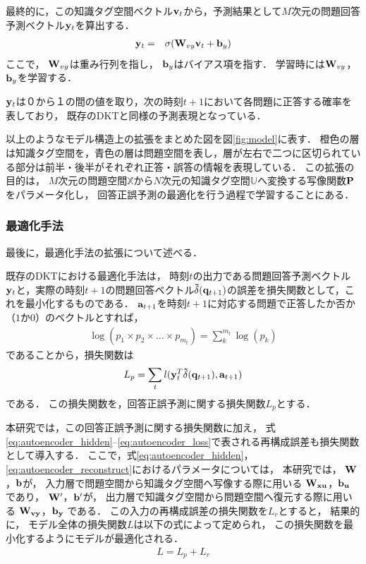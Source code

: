 最終的に，この知識タグ空間ベクトル${\bf v}_t$から，予測結果として$M$次元の問題回答予測ベクトル${\bf y}_t$を算出する．
\begin{eqnarray}
{\bf y}_t &=& \sigma( {\bf W}_{vy} {\bf v}_t + {\bf b}_y)
\end{eqnarray}
ここで，
${\bf W}_{vy}$は重み行列を指し，
${\bf b}_y$はバイアス項を指す．
学習時には${\bf W}_{vy}$，${\bf b}_y$を学習する．

${\bf y}_t$は０から１の間の値を取り，次の時刻$t+1$において各問題に正答する確率を表しており，
既存のDKTと同様の予測表現となっている．


以上のようなモデル構造上の拡張をまとめた図を図\ref{fig:model}に表す．
橙色の層は知識タグ空間を，青色の層は問題空間を表し，層が左右で二つに区切られている部分は前半・後半がそれぞれ正答・誤答の情報を表現している．
この拡張の目的は，
$M$次元の問題空間$\mathbb{X}$から$N$次元の知識タグ空間$\mathbb{U}$へ変換する写像関数${\bf P}$をパラメータ化し，
回答正誤予測の最適化を行う過程で学習することにある．



\subsubsection{最適化手法}
最後に，最適化手法の拡張について述べる．

既存のDKTにおける最適化手法は，
時刻$t$の出力である問題回答予測ベクトル${\bf y}_t$と，実際の時刻$t+1$の問題回答ベクトル${\bf\tilde{ \delta}}({\bf q}_{t+1})$の誤差を損失関数として，これを最小化するものである．
${\bf a}_{t+1}$を時刻$t+1$に対応する問題で正答したか否か（$1$か$0$）のベクトルとすれば，
\begin{eqnarray}
\label{eq:log_sum}
{\log(p_1 \times p_2 \times \dots \times p_{m_t}) = \sum_{k}^{m_t} \log(p_k)}
\end{eqnarray}
であることから，損失関数は
\begin{eqnarray}
\label{eq:prediction_entropy}
{L_p = \sum_t l({\bf y}_t^T {\bf \tilde{\delta}}({\bf q}_{t+1}), {\bf a}_{t+1})}
\end{eqnarray}
である．
この損失関数を，回答正誤予測に関する損失関数$L_p$とする．


本研究では，この回答正誤予測に関する損失関数に加え，
式\ref{eq:autoencoder_hidden}--\ref{eq:autoencoder_loss}で表される再構成誤差も損失関数として導入する．
ここで，式\ref{eq:autoencoder_hidden}，\ref{eq:autoencoder_reconstruct}におけるパラメータについては，
本研究では，
${\bf W}$，${\bf b}$が，
入力層で問題空間から知識タグ空間へ写像する際に用いる
${\bf W_{xu}}$，${\bf b_u}$
であり，
${\bf W'}$，${\bf b'}$が，
出力層で知識タグ空間から問題空間へ復元する際に用いる
${\bf W_{vy}}$，${\bf b_y}$
である．
この入力の再構成誤差の損失関数を$L_r$とすると，
結果的に，
モデル全体の損失関数$L$は以下の式によって定められ，
この損失関数を最小化するようにモデルが最適化される．
\begin{eqnarray}
\label{eq:total_loss}
{L = L_p + L_r}
\end{eqnarray}


